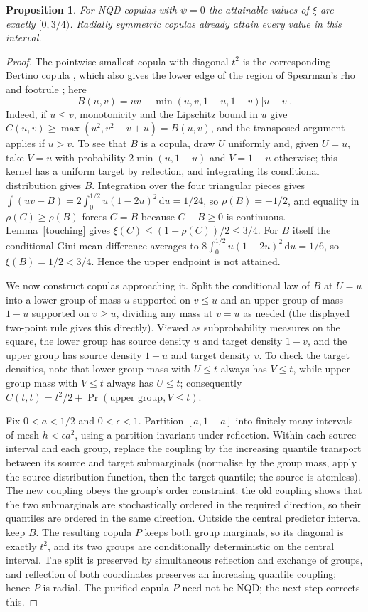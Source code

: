 \documentclass[11pt,a4paper]{article}
\newtheorem{proposition}[theorem]{Proposition}
\theoremstyle{remark}
\newcommand{\1}{\mathbf 1}
\newcommand{\dd}{\,\mathrm d}
\begin{document}
\begin{proposition}\label{negativezero}
For NQD copulas with $\psi=0$ the attainable values of $\xi$ are exactly $[0,3/4)$. Radially symmetric copulas already attain every value in this interval.
\end{proposition}
\begin{proof}
The pointwise smallest copula with diagonal $t^2$ is the corresponding Bertino copula \cite{bertino}, which also gives the lower edge of the region of Spearman's rho and footrule \cite{ar2}; here
\[
 B(u,v)=uv-\min(u,v,1-u,1-v)|u-v|.
\]
Indeed, if $u\le v$, monotonicity and the Lipschitz bound in $u$ give $C(u,v)\ge\max(u^2,v^2-v+u)=B(u,v)$, and the transposed argument applies if $u>v$. To see that $B$ is a copula, draw $U$ uniformly and, given $U=u$, take $V=u$ with probability $2\min(u,1-u)$ and $V=1-u$ otherwise; this kernel has a uniform target by reflection, and integrating its conditional distribution gives $B$. Integration over the four triangular pieces gives $\int(uv-B)=2\int_0^{1/2}u(1-2u)^2\dd u=1/24$, so $\rho(B)=-1/2$, and equality in $\rho(C)\ge\rho(B)$ forces $C=B$ because $C-B\ge0$ is continuous. Lemma~\ref{touching} gives $\xi(C)\le(1-\rho(C))/2\le3/4$. For $B$ itself the conditional Gini mean difference averages to $8\int_0^{1/2}u(1-2u)^2\dd u=1/6$, so $\xi(B)=1/2<3/4$. Hence the upper endpoint is not attained.

We now construct copulas approaching it. Split the conditional law of $B$ at $U=u$ into a lower group of mass $u$ supported on $v\le u$ and an upper group of mass $1-u$ supported on $v\ge u$, dividing any mass at $v=u$ as needed (the displayed two-point rule gives this directly). Viewed as subprobability measures on the square, the lower group has source density $u$ and target density $1-v$, and the upper group has source density $1-u$ and target density $v$. To check the target densities, note that lower-group mass with $U\le t$ always has $V\le t$, while upper-group mass with $V\le t$ always has $U\le t$; consequently $C(t,t)=t^2/2+\Pr(\text{upper group},V\le t)$.

Fix $0<a<1/2$ and $0<\epsilon<1$. Partition $[a,1-a]$ into finitely many intervals of mesh $h<\epsilon a^2$, using a partition invariant under reflection. Within each source interval and each group, replace the coupling by the increasing quantile transport between its source and target submarginals (normalise by the group mass, apply the source distribution function, then the target quantile; the source is atomless). The new coupling obeys the group's order constraint: the old coupling shows that the two submarginals are stochastically ordered in the required direction, so their quantiles are ordered in the same direction. Outside the central predictor interval keep $B$. The resulting copula $P$ keeps both group marginals, so its diagonal is exactly $t^2$, and its two groups are conditionally deterministic on the central interval. The split is preserved by simultaneous reflection and exchange of groups, and reflection of both coordinates preserves an increasing quantile coupling; hence $P$ is radial. The purified copula $P$ need not be NQD; the next step corrects this.


\end{proof}
\end{document}
